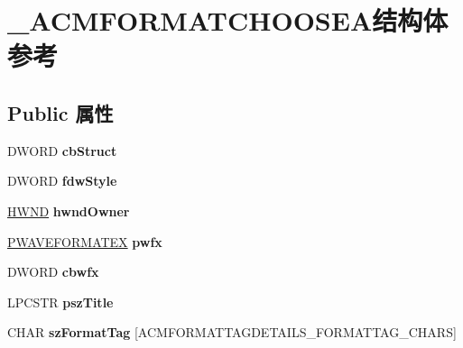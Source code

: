 \hypertarget{struct___a_c_m_f_o_r_m_a_t_c_h_o_o_s_e_a}{}\section{\+\_\+\+A\+C\+M\+F\+O\+R\+M\+A\+T\+C\+H\+O\+O\+S\+E\+A结构体 参考}
\label{struct___a_c_m_f_o_r_m_a_t_c_h_o_o_s_e_a}
\subsection*{Public 属性}
\begin{DoxyCompactItemize}
\item 
\mbox{\label{struct___a_c_m_f_o_r_m_a_t_c_h_o_o_s_e_a_abf8a689eee52110c9aac0a0f3452f417}} 
D\+W\+O\+RD {\bfseries cb\+Struct}
\item 
\mbox{\label{struct___a_c_m_f_o_r_m_a_t_c_h_o_o_s_e_a_ac9f27993f7483dcb64007d2323f53e8a}} 
D\+W\+O\+RD {\bfseries fdw\+Style}
\item 
\mbox{\label{struct___a_c_m_f_o_r_m_a_t_c_h_o_o_s_e_a_afc575b0698c1bd6e830e842ebe4b79f1}} 
\hyperlink{interfacevoid}{H\+W\+ND} {\bfseries hwnd\+Owner}
\item 
\mbox{\label{struct___a_c_m_f_o_r_m_a_t_c_h_o_o_s_e_a_a065a2cccc43cda543678260e9b17e9cd}} 
\hyperlink{struct___w_a_v_e_f_o_r_m_a_t_e_x}{P\+W\+A\+V\+E\+F\+O\+R\+M\+A\+T\+EX} {\bfseries pwfx}
\item 
\mbox{\label{struct___a_c_m_f_o_r_m_a_t_c_h_o_o_s_e_a_acefb8a69f7453780c38eca4e1e4d66cb}} 
D\+W\+O\+RD {\bfseries cbwfx}
\item 
\mbox{\label{struct___a_c_m_f_o_r_m_a_t_c_h_o_o_s_e_a_a1bd85cc989c5091e8bc7370edccc36a9}} 
L\+P\+C\+S\+TR {\bfseries psz\+Title}
\item 
\mbox{\label{struct___a_c_m_f_o_r_m_a_t_c_h_o_o_s_e_a_a159dd70fbd14659a606426e099d3b0e2}} 
C\+H\+AR {\bfseries sz\+Format\+Tag} \mbox{[}A\+C\+M\+F\+O\+R\+M\+A\+T\+T\+A\+G\+D\+E\+T\+A\+I\+L\+S\+\_\+\+F\+O\+R\+M\+A\+T\+T\+A\+G\+\_\+\+C\+H\+A\+RS\mbox{]}

\end{DoxyCompactItemize}
